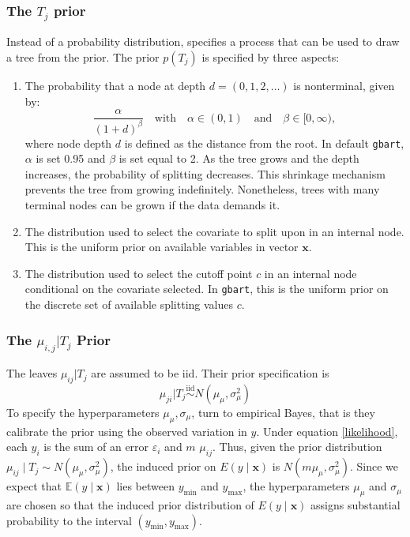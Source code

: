 \documentclass[a4paper,11pt]{article}
\begin{document}
\subsubsection{The $T_j$ prior}
 Instead of a probability distribution, \cite{chipmanBARTBayesianAdditive2010} specifies a process that can be used to draw a tree from the prior. The prior \( p(T_j) \) is specified by three aspects:
\begin{enumerate}
    \item The probability that a node at depth \( d = (0, 1, 2, \ldots) \) is nonterminal, given by:
    \[
    \frac{\alpha}{(1 + d)^\beta}  \quad \text{with} \quad \alpha \in (0, 1) \quad \text{and} \quad \beta \in [0, \infty),
    \]
    where node depth $d$ is defined as the distance from the root. In default \texttt{gbart}, $\alpha$ is set 0.95 and $\beta$ is set equal to 2. As the tree grows and the depth increases, the probability of splitting decreases. This shrinkage mechanism prevents the tree from growing indefinitely. Nonetheless, trees with many terminal nodes can be grown if the data demands it.
    \item The distribution used to select the covariate to split upon in an internal node. This is the uniform prior on available variables in vector $\mathbf{x}$.
    \item The distribution used to select the cutoff point $c$ in an internal node conditional on the covariate selected. In \texttt{gbart}, this is the uniform prior on the discrete set of available splitting values $c$.
\end{enumerate}

\subsubsection{The \( \mu_{i,j} | T_j \) Prior}
The leaves $\mu_{ij} | T_j$ are assumed to be iid. Their prior specification is $$ \mu_{ji} |T_j \overset{\text{iid}}{\sim}N(\mu_\mu, \sigma_\mu^2)$$
To specify the hyperparameters $\mu_\mu, \sigma_\mu$, \cite{chipmanBARTBayesianAdditive2010} turn to empirical Bayes, that is they calibrate the prior using the observed variation in \( y \). Under equation \eqref{likelihood}, each $y_i$ is the sum of an error $\varepsilon_i$ and $m$ $\mu_{ij}$. Thus, given the prior distribution $\mu_{ij} \mid T_j \sim N(\mu_\mu, \sigma^2_\mu)$, the induced prior on $E(y \mid \mathbf{x})$ is \(N(m\mu_\mu, \sigma^2_\mu)\). Since we expect that \(\mathbb{E}(y \mid \mathbf{x})\) lies between \(y_{\text{min}}\) and \(y_{\text{max}}\), the hyperparameters \(\mu_\mu\) and \(\sigma_\mu\) are chosen so that the induced prior distribution of $E(y \mid \mathbf{x})$ assigns substantial probability to the interval \((y_{\text{min}}, y_{\text{max}})\). 
\end{document}
